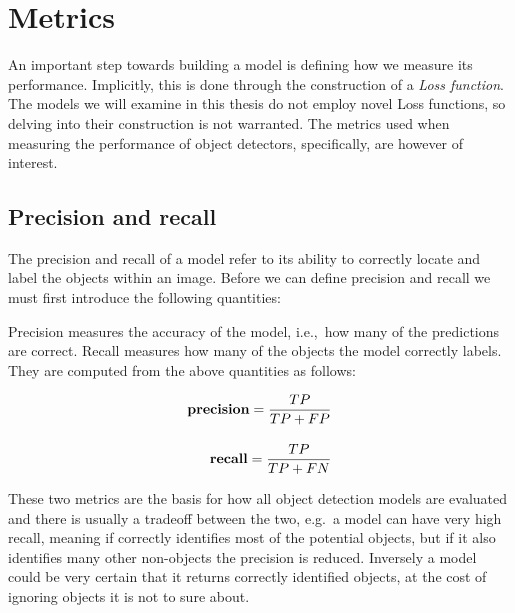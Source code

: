 \section{Metrics}
An important step towards building a model is defining how we measure its performance.
Implicitly, this is done through the construction of a \textit{Loss function}.
The models we will examine in this thesis do not employ novel Loss functions, so delving into their construction is not warranted.
The metrics used when measuring the performance of object detectors, specifically, are however of interest.

\subsection{Precision and recall}
The precision and recall of a model refer to its ability to correctly locate and label the objects within an image.
Before we can define precision and recall we must first introduce the following quantities:

\begin{center}
  {\setlength{\fboxsep}{1em}
  }
\end{center}

Precision measures the accuracy of the model, i.e.,~how many of the predictions are correct.
Recall measures how many of the objects the model correctly labels.
They are computed from the above quantities as follows:

\begin{align*}
  \text{\bf precision}=\frac{TP}{TP+FP}\\[1em]
  \text{\bf recall}=\frac{TP}{TP+FN}
\end{align*}

These two metrics are the basis for how all object detection models are evaluated and there is usually a tradeoff between the two, e.g.~a model can have very high recall, meaning if correctly identifies most of the potential objects, but if it also identifies many other non-objects the precision is reduced.
Inversely a model could be very certain that it returns correctly identified objects, at the cost of ignoring objects it is not to sure about.

